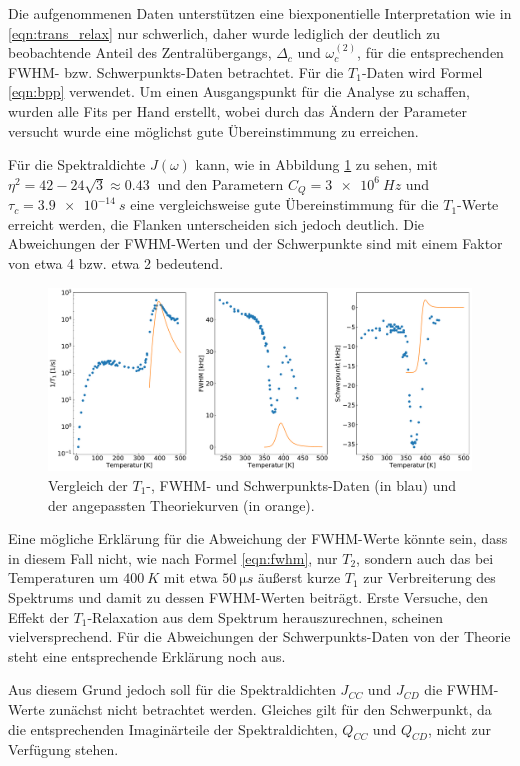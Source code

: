 Die aufgenommenen Daten unterstützen eine biexponentielle Interpretation wie in \eqref{eqn:trans_relax} nur schwerlich, daher wurde lediglich der deutlich zu beobachtende Anteil des Zentralübergangs, $\Delta_c$ und $\omega_c^{(2)}$, für die entsprechenden FWHM- bzw. Schwerpunkts-Daten betrachtet. Für die $T_1$-Daten wird Formel \eqref{eqn:bpp} verwendet. Um einen Ausgangspunkt für die Analyse zu schaffen, wurden alle Fits per Hand erstellt, wobei durch das Ändern der Parameter versucht wurde eine möglichst gute Übereinstimmung zu erreichen.

Für die Spektraldichte $J(\omega)$ kann, wie in Abbildung \ref{fig:triple_vergleich} zu sehen, mit $\eta^2 = 42 - 24 \sqrt{3} \approx \SI{0.43}{}$ \cite{caer} und den Parametern $C_Q = \SI{3e6}{Hz}$ und $\tau_c = \SI{3.9e-14}{s}$ eine vergleichsweise gute Übereinstimmung für die $T_1$-Werte erreicht werden, die Flanken unterscheiden sich jedoch deutlich. Die Abweichungen der FWHM-Werten und der Schwerpunkte sind mit einem Faktor von etwa 4 bzw. etwa 2 bedeutend.
\begin{figure}[htbp]
	\includegraphics[width=\textwidth]{graphics/zwischenbericht/J_fertig.pdf}
	\caption{Vergleich der $T_1$-, FWHM- und Schwerpunkts-Daten (in blau) und der angepassten Theoriekurven (in orange). \label{fig:triple_vergleich}}
\end{figure}

Eine mögliche Erklärung für die Abweichung der FWHM-Werte könnte sein, dass in diesem Fall nicht, wie nach Formel \eqref{eqn:fwhm}, nur $T_2$, sondern auch das bei Temperaturen um $\SI{400}{K}$ mit etwa $\SI{50}{\micro s}$ äußerst kurze $T_1$ zur Verbreiterung des Spektrums und damit zu dessen FWHM-Werten beiträgt. Erste Versuche, den Effekt der $T_1$-Relaxation aus dem Spektrum herauszurechnen, scheinen vielversprechend. Für die Abweichungen der Schwerpunkts-Daten von der Theorie steht eine entsprechende Erklärung noch aus.

Aus diesem Grund jedoch soll für die Spektraldichten $J_{CC}$ und $J_{CD}$ die FWHM-Werte zunächst nicht betrachtet werden. Gleiches gilt für den Schwerpunkt, da die entsprechenden Imaginärteile der Spektraldichten, $Q_{CC}$ und $Q_{CD}$, nicht zur Verfügung stehen.

